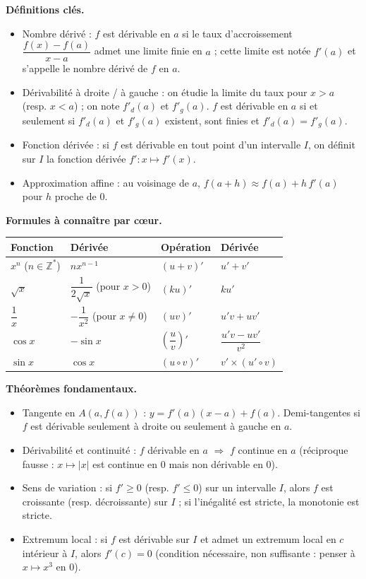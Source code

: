 \documentclass[11pt]{article}
\newcommand{\cle}[1]{{\popxbold\color{popdark}#1}}
\begin{document}
\begin{aretenir}
\textbf{Définitions clés.}
\begin{itemize}
  \item \cle{Nombre dérivé} : $f$ est dérivable en $a$ si le taux d'accroissement $\dfrac{f(x)-f(a)}{x-a}$ admet une limite finie en $a$ ; cette limite est notée $f'(a)$ et s'appelle le nombre dérivé de $f$ en $a$.
  \item \cle{Dérivabilité à droite / à gauche} : on étudie la limite du taux pour $x>a$ (resp. $x<a$) ; on note $f'_d(a)$ et $f'_g(a)$. $f$ est dérivable en $a$ si et seulement si $f'_d(a)$ et $f'_g(a)$ existent, sont finies et $f'_d(a)=f'_g(a)$.
  \item \cle{Fonction dérivée} : si $f$ est dérivable en tout point d'un intervalle $I$, on définit sur $I$ la fonction dérivée $f' : x\mapsto f'(x)$.
  \item \cle{Approximation affine} : au voisinage de $a$, $f(a+h)\approx f(a)+h\,f'(a)$ pour $h$ proche de $0$.
\end{itemize}

\textbf{Formules à connaître par cœur.}
\begin{center}
\begin{tabularx}{\linewidth}{|l|X|l|X|}\hline
\rowcolor{popblueL} Fonction & Dérivée & Opération & Dérivée \\ \hline
$x^n$ ($n\in\mathbb{Z}^*$) & $nx^{n-1}$ & $(u+v)'$ & $u'+v'$ \\ \hline
$\sqrt{x}$ & $\dfrac{1}{2\sqrt{x}}$ (pour $x>0$) & $(ku)'$ & $ku'$ \\ \hline
$\dfrac{1}{x}$ & $-\dfrac{1}{x^2}$ (pour $x\neq 0$) & $(uv)'$ & $u'v+uv'$ \\ \hline
$\cos x$ & $-\sin x$ & $\left(\dfrac{u}{v}\right)'$ & $\dfrac{u'v-uv'}{v^2}$ \\ \hline
$\sin x$ & $\cos x$ & $(u\circ v)'$ & $v'\times(u'\circ v)$ \\ \hline
\end{tabularx}
\end{center}

\textbf{Théorèmes fondamentaux.}
\begin{itemize}
  \item \cle{Tangente} en $A(a,f(a))$ : $y=f'(a)(x-a)+f(a)$. Demi-tangentes si $f$ est dérivable seulement à droite ou seulement à gauche en $a$.
  \item \cle{Dérivabilité et continuité} : $f$ dérivable en $a$ $\Rightarrow$ $f$ continue en $a$ (réciproque fausse : $x\mapsto|x|$ est continue en $0$ mais non dérivable en $0$).
  \item \cle{Sens de variation} : si $f'\geq 0$ (resp. $f'\leq 0$) sur un intervalle $I$, alors $f$ est croissante (resp. décroissante) sur $I$ ; si l'inégalité est stricte, la monotonie est stricte.
  \item \cle{Extremum local} : si $f$ est dérivable sur $I$ et admet un extremum local en $c$ intérieur à $I$, alors $f'(c)=0$ (condition nécessaire, non suffisante : penser à $x\mapsto x^3$ en $0$).
\end{itemize}


\end{aretenir}
\end{document}
